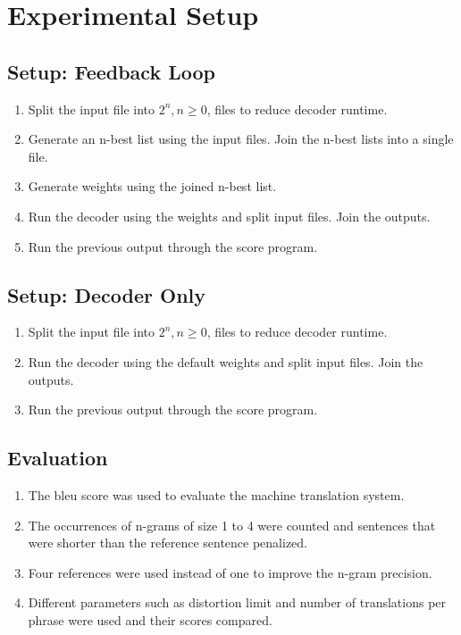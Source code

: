 \documentclass[letterpaper]{article}
\begin{document}
\section{Experimental Setup}

\subsection{Setup: Feedback Loop}

\begin{enumerate}
    \item Split the input file into \(2^n, n \ge 0\), files to reduce decoder runtime.
    \item Generate an n-best list using the input files. Join the n-best lists into a single file.
    \item Generate weights using the joined n-best list.
    \item Run the decoder using the weights and split input files. Join the outputs.
    \item Run the previous output through the score program.
\end{enumerate}

\subsection{Setup: Decoder Only}

\begin{enumerate}
    \item Split the input file into \(2^n, n \ge 0\), files to reduce decoder runtime.
    \item Run the decoder using the default weights and split input files. Join the outputs.
    \item Run the previous output through the score program.
\end{enumerate}

\subsection{Evaluation}

\begin{enumerate}
    \item The bleu score was used to evaluate the machine translation system.
    \item The occurrences of n-grams of size 1 to 4 were counted and sentences that were shorter than the reference sentence penalized.
    \item Four references were used instead of one to improve the n-gram precision.
    \item Different parameters such as distortion limit and number of translations per phrase were used and their scores compared.
\end{enumerate}
\end{document}
